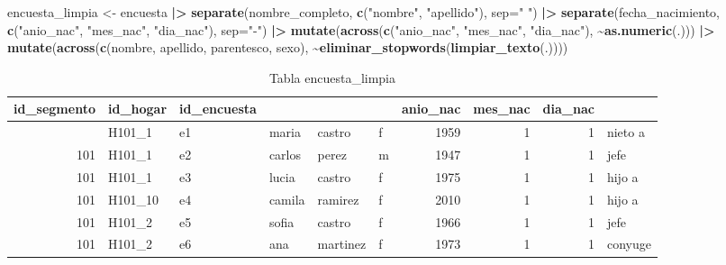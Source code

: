 \documentclass[
  12pt,
]{book}
\newenvironment{Shaded}{\begin{snugshade}}{\end{snugshade}}
\newcommand{\AttributeTok}[1]{\textcolor[rgb]{0.13,0.29,0.53}{#1}}
\newcommand{\FunctionTok}[1]{\textcolor[rgb]{0.13,0.29,0.53}{\textbf{#1}}}
\newcommand{\NormalTok}[1]{#1}
\newcommand{\OtherTok}[1]{\textcolor[rgb]{0.56,0.35,0.01}{#1}}
\newcommand{\SpecialCharTok}[1]{\textcolor[rgb]{0.81,0.36,0.00}{\textbf{#1}}}
\newcommand{\StringTok}[1]{\textcolor[rgb]{0.31,0.60,0.02}{#1}}
\begin{document}
\begin{Shaded}
\begin{Highlighting}[]
\NormalTok{encuesta\_limpia }\OtherTok{\textless{}{-}}\NormalTok{ encuesta }\SpecialCharTok{|\textgreater{}} 
                   \FunctionTok{separate}\NormalTok{(nombre\_completo, }\FunctionTok{c}\NormalTok{(}\StringTok{"nombre"}\NormalTok{, }\StringTok{"apellido"}\NormalTok{), }\AttributeTok{sep=}\StringTok{" "}\NormalTok{) }\SpecialCharTok{|\textgreater{}} 
                   \FunctionTok{separate}\NormalTok{(fecha\_nacimiento, }\FunctionTok{c}\NormalTok{(}\StringTok{"anio\_nac"}\NormalTok{, }\StringTok{"mes\_nac"}\NormalTok{, }\StringTok{"dia\_nac"}\NormalTok{), }\AttributeTok{sep=}\StringTok{"{-}"}\NormalTok{) }\SpecialCharTok{|\textgreater{}} 
                   \FunctionTok{mutate}\NormalTok{(}\FunctionTok{across}\NormalTok{(}\FunctionTok{c}\NormalTok{(}\StringTok{"anio\_nac"}\NormalTok{, }\StringTok{"mes\_nac"}\NormalTok{, }\StringTok{"dia\_nac"}\NormalTok{), }\SpecialCharTok{\textasciitilde{}}\FunctionTok{as.numeric}\NormalTok{(.))) }\SpecialCharTok{|\textgreater{}}   
                   \FunctionTok{mutate}\NormalTok{(}\FunctionTok{across}\NormalTok{(}\FunctionTok{c}\NormalTok{(nombre, apellido, parentesco, sexo),}
                                 \SpecialCharTok{\textasciitilde{}}\FunctionTok{eliminar\_stopwords}\NormalTok{(}\FunctionTok{limpiar\_texto}\NormalTok{(.))))}
\end{Highlighting}
\end{Shaded}

\begin{table}[t]
\caption*{
{\large Tabla encuesta\_limpia}
} 
\fontsize{12.0pt}{14.4pt}\selectfont
\begin{tabular*}{\linewidth}{@{\extracolsep{\fill}}rlllllrrrl}
\toprule
id\_segmento & id\_hogar & id\_encuesta & {\bfseries \cellcolor[HTML]{F9F9F9}{nombre}} & {\bfseries \cellcolor[HTML]{F9F9F9}{apellido}} & {\bfseries \cellcolor[HTML]{F9F9F9}{sexo}} & anio\_nac & mes\_nac & dia\_nac & {\bfseries \cellcolor[HTML]{F9F9F9}{parentesco}} \\ 
\midrule\addlinespace[2.5pt]
101 & H101\_1 & e1 & maria & castro & f & 1959 & 1 & 1 & nieto a \\ 
101 & H101\_1 & e2 & carlos & perez & m & 1947 & 1 & 1 & jefe \\ 
101 & H101\_1 & e3 & lucia & castro & f & 1975 & 1 & 1 & hijo a \\ 
101 & H101\_10 & e4 & camila & ramirez & f & 2010 & 1 & 1 & hijo a \\ 
101 & H101\_2 & e5 & sofia & castro & f & 1966 & 1 & 1 & jefe \\ 
101 & H101\_2 & e6 & ana & martinez & f & 1973 & 1 & 1 & conyuge \\ 
\bottomrule
\end{tabular*}
\end{table}
\end{document}
